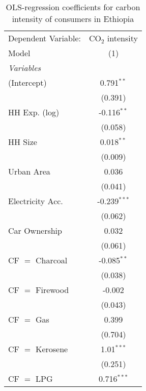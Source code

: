 
\begin{table}[htbp!]
   \centering
   \small
   \begin{adjustbox}{width = 1\textwidth, max height = 0.95\textheight, center}
      \begin{threeparttable}[b]
         \caption{\label{tab:OLS_1_ETH} OLS-regression coefficients for carbon intensity of consumers in Ethiopia}
         \begin{tabular}{lc}
            \tabularnewline \midrule \midrule
            Dependent Variable: & CO$_{2}$ intensity\\  
            Model               & (1)\\  
            \midrule
            \emph{Variables}\\
            (Intercept)         & 0.791$^{**}$\\   
                                & (0.391)\\   
            HH Exp. (log)       & -0.116$^{**}$\\   
                                & (0.058)\\   
            HH Size             & 0.018$^{**}$\\   
                                & (0.009)\\   
            Urban Area          & 0.036\\   
                                & (0.041)\\   
            Electricity Acc.    & -0.239$^{***}$\\   
                                & (0.062)\\   
            Car Ownership       & 0.032\\   
                                & (0.061)\\   
            CF $=$ Charcoal     & -0.085$^{**}$\\   
                                & (0.038)\\   
            CF $=$ Firewood     & -0.002\\   
                                & (0.043)\\   
            CF $=$ Gas          & 0.399\\   
                                & (0.704)\\   
            CF $=$ Kerosene     & 1.01$^{***}$\\   
                                & (0.251)\\   
            CF $=$ LPG          & 0.716$^{***}$\\   

\end{tabular}
\end{threeparttable}
\end{adjustbox}
\end{table}
